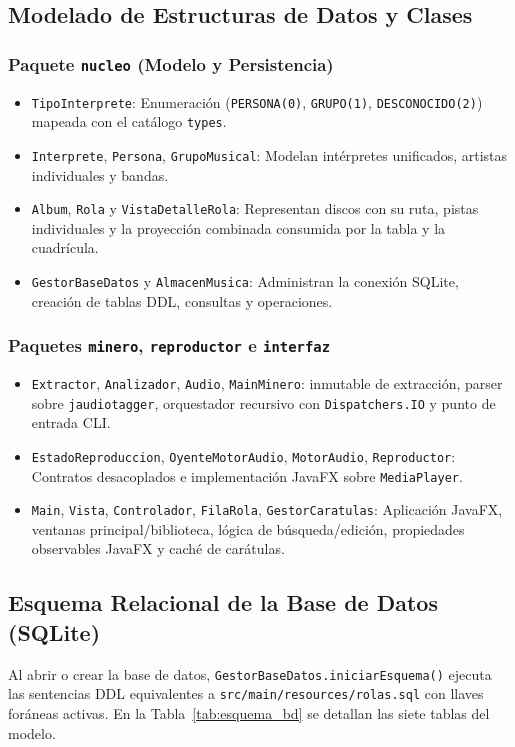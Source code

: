 \documentclass[12pt,a4paper]{article}
\begin{document}
\subsection{Modelado de Estructuras de Datos y Clases}
\subsubsection{Paquete \texttt{nucleo} (Modelo y Persistencia)}
\begin{itemize}[noitemsep]
    \item \texttt{TipoInterprete}: Enumeración (\texttt{PERSONA(0)}, \texttt{GRUPO(1)}, \texttt{DESCONOCIDO(2)}) mapeada con el catálogo \texttt{types}.
    \item \texttt{Interprete}, \texttt{Persona}, \texttt{GrupoMusical}: Modelan intérpretes unificados, artistas individuales y bandas.
    \item \texttt{Album}, \texttt{Rola} y \texttt{VistaDetalleRola}: Representan discos con su ruta, pistas individuales y la proyección combinada consumida por la tabla y la cuadrícula.
    \item \texttt{GestorBaseDatos} y \texttt{AlmacenMusica}: Administran la conexión SQLite, creación de tablas DDL, consultas y operaciones.
\end{itemize}

\subsubsection{Paquetes \texttt{minero}, \texttt{reproductor} e \texttt{interfaz}}
\begin{itemize}[noitemsep]
    \item \texttt{Extractor}, \texttt{Analizador}, \texttt{Audio}, \texttt{MainMinero}: inmutable de extracción, parser sobre \texttt{jaudiotagger}, orquestador recursivo con \texttt{Dispatchers.IO} y punto de entrada CLI.
    \item \texttt{EstadoReproduccion}, \texttt{OyenteMotorAudio}, \texttt{MotorAudio}, \texttt{Reproductor}: Contratos desacoplados e implementación JavaFX sobre \texttt{MediaPlayer}.
    \item \texttt{Main}, \texttt{Vista}, \texttt{Controlador}, \texttt{FilaRola}, \texttt{GestorCaratulas}: Aplicación JavaFX, ventanas principal/biblioteca, lógica de búsqueda/edición, propiedades observables JavaFX y caché de carátulas.
\end{itemize}

\subsection{Esquema Relacional de la Base de Datos (SQLite)}
Al abrir o crear la base de datos, \texttt{GestorBaseDatos.iniciarEsquema()} ejecuta las sentencias DDL equivalentes a \texttt{src/main/resources/rolas.sql} con llaves foráneas activas. En la Tabla~\ref{tab:esquema_bd} se detallan las siete tablas del modelo.
\end{document}
